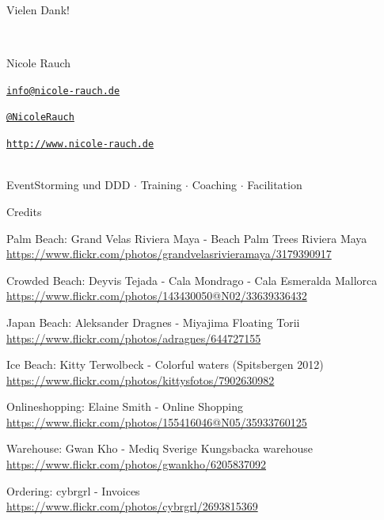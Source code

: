 \begin{frame}{Vielen Dank!}
        
        ~\\[1em]
        \begin{block}{Nicole Rauch}
        \begin{description}[Twitterxx]
                \item[E-Mail]  \href{mailto:info@nicole-rauch.de}{\texttt{info@nicole-rauch.de}}
                \item[Twitter] \href{http://twitter.com/NicoleRauch}{\texttt{@NicoleRauch}}
                \item[Web] \href{http://www.nicole-rauch.de}{\texttt{http://www.nicole-rauch.de}}
        \end{description}
        \end{block}
        ~\\[1em]
        EventStorming und DDD $\cdot$ Training $\cdot$ Coaching $\cdot$ Facilitation
\end{frame}

\begin{frame}{Credits}

Palm Beach: Grand Velas Riviera Maya - Beach Palm Trees Riviera Maya \\
{\footnotesize \url{https://www.flickr.com/photos/grandvelasrivieramaya/3179390917}}

Crowded Beach: Deyvis Tejada - Cala Mondrago - Cala Esmeralda Mallorca  \\
{\footnotesize \url{https://www.flickr.com/photos/143430050@N02/33639336432}}

Japan Beach: Aleksander Dragnes - Miyajima Floating Torii  \\
{\footnotesize \url{https://www.flickr.com/photos/adragnes/644727155}}

Ice Beach: Kitty Terwolbeck - Colorful waters (Spitsbergen 2012)  \\
{\footnotesize \url{https://www.flickr.com/photos/kittysfotos/7902630982}}

Onlineshopping: Elaine Smith - Online Shopping \\
{\footnotesize \url{https://www.flickr.com/photos/155416046@N05/35933760125}}

Warehouse: Gwan Kho - Mediq Sverige Kungsbacka warehouse \\
{\footnotesize \url{https://www.flickr.com/photos/gwankho/6205837092}}

Ordering: cybrgrl - Invoices \\
{\footnotesize \url{https://www.flickr.com/photos/cybrgrl/2693815369}}


{\footnotesize \url{}}
{\footnotesize \url{}}
{\footnotesize \url{}}

\end{frame}


